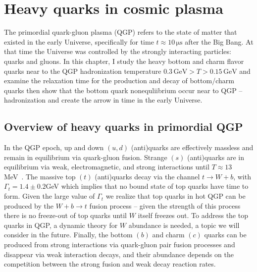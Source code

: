 \section{Heavy quarks in cosmic plasma} \label{Bottom}

The primordial quark-gluon plasma (QGP) refers to the state of matter that existed in the early Universe, specifically for time $t\approx10\, \mathrm{\mu s}$ after the Big Bang. At that time the Universe was controlled by the strongly interacting particles: quarks and gluons. In this chapter, I study the heavy bottom and charm flavor quarks near to the QGP hadronization temperature $0.3\,\mathrm{GeV}>T>0.15\,\mathrm{GeV}$ and examine the relaxation time for the production and decay of bottom/charm quarks then show that the bottom quark nonequliibrium occur near to QGP –hadronization and create the arrow in time in the early Universe.


\subsection{Overview of heavy quarks in primordial QGP}




In the QGP epoch, up and down $(u,d)$ (anti)quarks are effectively massless and remain in equilibrium via quark-gluon fusion. Strange $(s)$ (anti)quarks are in equilibrium via weak, electromagnetic, and strong interactions until $T\approx13$ MeV~\cite{Yang:2021bko}. The massive top $(t)$ (anti)quarks decay via the channel $t\to W+b$, with $\Gamma_t=1.4\pm0.2$\;GeV \cite{ParticleDataGroup:2018ovx} which implies that no bound state of top quarks have time to form. Given the large value of $\Gamma_t$ we realize that top quarks in hot QGP can be produced by the $ W+b\to t$ fusion process -- given the strength of this process there is no freeze-out of top quarks until $W$ itself freezes out. To address the top quarks in QGP, a dynamic theory for $W$ abundance is needed, a topic we will consider in the future. Finally, the bottom $(b)$ and charm $(c)$ quarks can be produced from strong interactions via quark-gluon pair fusion processes and disappear via weak interaction decays, and their abundance depends on the competition between the strong fusion and weak decay reaction rates.

